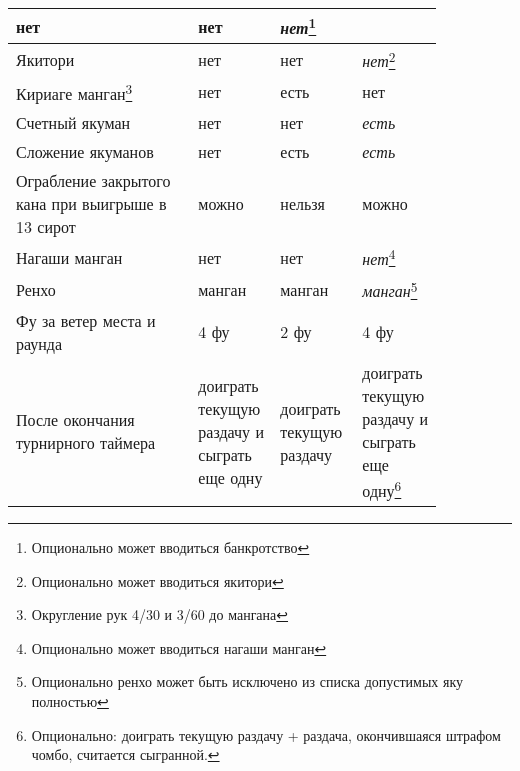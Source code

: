 \begin{tabularx}{\linewidth}{L{0.4\linewidth}L{0.15\linewidth}L{0.15\linewidth}L{0.15\linewidth}}
	нет &
	нет &
	\textit{нет}\footnote{Опционально может вводиться банкротство} \\
	\midrule
	Якитори &
	нет &
	нет &
	\textit{нет}\footnote{Опционально может вводиться якитори} \\
	\midrule
	Кириаге манган\footnote{Округление рук 4/30 и 3/60 до мангана} &
	нет &
	есть &
	нет \\
	\midrule
	Счетный якуман &
	нет &
	нет &
	\textit{есть} \\
	\midrule
	Сложение якуманов &
	нет &
	есть &
	\textit{есть} \\
	\midrule
	Ограбление закрытого кана при выигрыше в 13 сирот &
	можно &
	нельзя &
	можно \\
	\midrule
	Нагаши манган &
	нет &
	нет &
	\textit{нет}\footnote{Опционально может вводиться нагаши манган} \\
	\midrule
	Ренхо &
	манган &
	манган &
	\textit{манган}\footnote{Опционально ренхо может быть исключено из списка допустимых яку полностью} \\
	\midrule
	Фу за ветер места и раунда &
	4 фу &
	2 фу &
	4 фу \\
	\midrule
	После окончания турнирного таймера &
	доиграть текущую раздачу и сыграть еще одну &
	доиграть текущую раздачу &
	доиграть текущую раздачу и сыграть еще одну\footnote{Опционально: доиграть текущую раздачу + раздача, окончившаяся штрафом чомбо, считается сыгранной.} \\
	

\end{tabularx}
